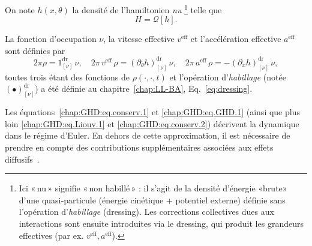 On note $h(x,\theta)$ la densité de l'hamiltonien \emph{nu}
\footnote{Ici «\,nu\,» signifie «\,non habillé\,» : il s'agit de la densité d'énergie «brute» d'une quasi‑particule (énergie cinétique + potentiel externe) définie sans l'opération d'\emph{habillage} (dressing). Les corrections collectives dues aux interactions sont ensuite introduites via le dressing, qui produit les grandeurs effectives (par ex. $v^{\mathrm{eff}},a^{\mathrm{eff}}$).}
telle que
\begin{equation}\label{chap:GHD:eq.ham.1}
	H = \mathcal{Q}[h].
\end{equation}

La fonction d’occupation $\nu$, la vitesse effective $v^{\mathrm{eff}}$ et l’accélération effective $a^{\mathrm{eff}}$ sont définies par
\begin{equation}\label{chap:GHD:eq.nu.v.a.1}
	2 \pi \rho =  1^{\mathrm{dr}}_{[\nu]} \, \nu , 
	\quad 2 \pi \, v^{\mathrm{eff}} \, \rho  =(\partial_\theta h )^{\mathrm{dr}}_{[\nu]} \, \nu , 
	\quad 2 \pi \, a^{\mathrm{eff}} \, \rho  = -(\partial_x h )^{\mathrm{dr}}_{[\nu]}\, \nu ,
\end{equation}
toutes trois étant des fonctions de $\rho(\cdot,\cdot,t)$ et l’opération d’\emph{habillage} (notée $(\bullet)^{\mathrm{dr}}_{[\nu]}$) a été définie au chapitre~\ref{chap:LL-BA}, Eq.~\eqref{eq:dressing}.

\medskip

Les équations~\eqref{chap:GHD:eq.conserv.1} et \eqref{chap:GHD:eq.GHD.1} (ainsi que plus loin \eqref{chap:GHD:eq.Liouv.1} et \eqref{chap:GHD:eq.conserv.2}) décrivent la dynamique dans le régime d’Euler. En dehors de cette approximation, il est nécessaire de prendre en compte des contributions supplémentaires associées aux effets diffusifs~\cite{DeNardis2018,10.21468/SciPostPhys.6.4.049,hübner2024diffusivehydrodynamicslongrangecorrelations}.

